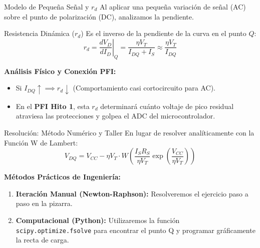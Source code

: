 \documentclass[10pt, aspectratio=169]{beamer}
\begin{document}
\begin{frame}{Modelo de Pequeña Señal y $r_d$}
  Al aplicar una pequeña variación de señal (AC) sobre el punto de polarización (DC), analizamos la pendiente.
  
  \begin{block}{Resistencia Dinámica ($r_d$)}
      Es el inverso de la pendiente de la curva en el punto $Q$:
      \begin{equation*}
          r_d = \left. \frac{d V_D}{d I_D} \right\vert_{Q} = \frac{\eta V_T}{I_{DQ} + I_S} \approx \frac{\eta V_T}{I_{DQ}}
      \end{equation*}
  \end{block}
  
  \textbf{Análisis Físico y Conexión PFI:}
  \begin{itemize}
      \item Si $I_{DQ} \uparrow \implies r_d \downarrow$ (Comportamiento casi cortocircuito para AC).
      \item En el \textbf{PFI Hito 1}, esta $r_d$ determinará cuánto voltaje de pico residual atraviesa las protecciones y golpea el ADC del microcontrolador.
  \end{itemize}
\end{frame}

\begin{frame}{Resolución: Método Numérico y Taller}
  En lugar de resolver analíticamente con la Función W de Lambert:
  \begin{equation*}
      V_{DQ} = V_{CC} - \eta V_T \cdot W \left( \frac{I_S R_S}{\eta V_T} \exp\left(\frac{V_{CC}}{\eta V_T}\right) \right)
  \end{equation*}
  
  \vspace{0.3cm}
  \textbf{Métodos Prácticos de Ingeniería:}
  \begin{enumerate}
      \item \textbf{Iteración Manual (Newton-Raphson):} Resolveremos el ejercicio paso a paso en la pizarra.
      \item \textbf{Computacional (Python):} Utilizaremos la función \texttt{scipy.optimize.fsolve} para encontrar el punto Q y programar gráficamente la recta de carga.
  \end{enumerate}
\end{frame}
\end{document}
